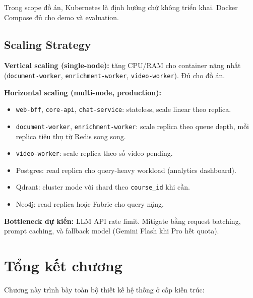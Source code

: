 Trong scope đồ án, Kubernetes là định hướng chứ không triển khai. Docker
Compose đủ cho demo và evaluation.

\subsection{Scaling Strategy}

\textbf{Vertical scaling (single-node):} tăng CPU/RAM cho container nặng
nhất (\texttt{document-worker}, \texttt{enrichment-worker},
\texttt{video-worker}). Đủ cho đồ án.

\textbf{Horizontal scaling (multi-node, production):}
\begin{itemize}
    \item \texttt{web-bff}, \texttt{core-api}, \texttt{chat-service}:
          stateless, scale linear theo replica.
    \item \texttt{document-worker}, \texttt{enrichment-worker}: scale
          replica theo queue depth, mỗi replica tiêu thụ từ Redis song song.
    \item \texttt{video-worker}: scale replica theo số video pending.
    \item Postgres: read replica cho query-heavy workload (analytics
          dashboard).
    \item Qdrant: cluster mode với shard theo \texttt{course\_id} khi cần.
    \item Neo4j: read replica hoặc Fabric cho query nặng.
\end{itemize}

\textbf{Bottleneck dự kiến:} LLM API rate limit. Mitigate bằng request
batching, prompt caching, và fallback model (Gemini Flash khi Pro hết
quota).

\section{Tổng kết chương}

Chương này trình bày toàn bộ thiết kế hệ thống ở cấp kiến trúc:

